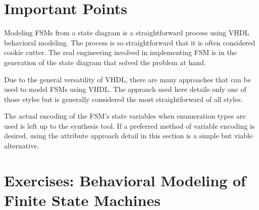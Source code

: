\section{Important Points}

\begin{my_list}
\item Modeling FSMs from a state diagram is a straightforward process using VHDL behavioral modeling. The process is so straightforward that it is often considered cookie cutter. The real engineering involved in implementing FSM is in the generation of the state diagram that solved the problem at hand.

\item Due to the general versatility of VHDL, there are many approaches that can be used to model FSMs using VHDL. The approach used here details only one of those styles but is generally considered the most straightforward of all styles. 

\item The actual encoding of the FSM's state variables when enumeration types are used is left up to the synthesis tool. If a preferred method of variable encoding is desired, using the attribute approach detail in this section is a simple but viable alternative. 
\end{my_list}

\section{Exercises: Behavioral Modeling of Finite State Machines}

